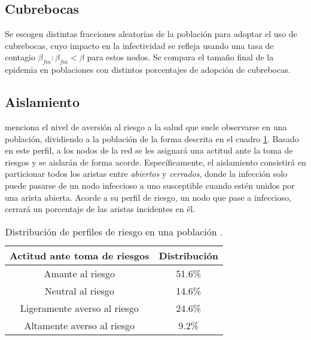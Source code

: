 \subsection{Cubrebocas}\label{subsect:fm}
Se escogen distintas fracciones aleatorias de la población para adoptar el uso de cubrebocas, cuyo impacto en la infectividad se refleja usando una tasa de contagio $\beta_{fm} : \beta_{fm} < \beta$ para estos nodos. Se compara el tamaño final de la epidemia en poblaciones con distintos porcentajes de adopción de cubrebocas. 

\subsection{Aislamiento}\label{subsect:aisl}
\citet{cerami2021risk} menciona el nivel de aversión al riesgo a la salud que suele observarse en una población, dividiendo a la población de la forma descrita en el cuadro \ref{table:perfil_riesgo}. Basado en este perfil, a los nodos de la red se les asignará una actitud ante la toma de riesgos y se aislarán de forma acorde. Específicamente, el aislamiento consistirá en particionar todos los aristas entre \textit{abiertos} y \textit{cerrados}, donde la infección solo puede pasarse de un nodo infeccioso a uno susceptible cuando estén unidos por una arista abierta. Acorde a su perfil de riesgo, un nodo que pase a infeccioso, cerrará un porcentaje de las aristas incidentes en él.  

\begin{table}
\caption{Distribución de perfiles de riesgo en una población \citep{cerami2021risk}.}
\label{table:perfil_riesgo}
\centering
\begin{tabular}{||c c||}
 \hline
 Actitud ante toma de riesgos & Distribución \\[0.5ex] 
 \hline\hline
 Amante al riesgo & 51.6\% \\ 
 \hline
 Neutral al riesgo & 14.6\% \\
 \hline
 Ligeramente averso al riesgo &  24.6\%\\
 \hline
 Altamente averso al riesgo & 9.2\% \\  [1ex] 
 \hline
\end{tabular}
\end{table}


